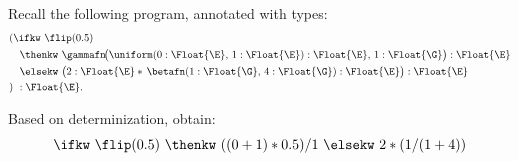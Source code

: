 \begin{example}
  Recall the following program, annotated with types:
  \[
    \begin{aligned}
    &(\ifkw\ \flip(0.5) \\
    &\quad \thenkw\ \gammafn\!\big(
      \uniform(0 : \Float{\E},\, 1 : \Float{\E}) : \Float{\E},\,
      1 : \Float{\G}
    \big) : \Float{\E} \\
    &\quad \elsekw\ \big(
      2 : \Float{\E}
      *\,
      \betafn(1 : \Float{\G},\, 4 : \Float{\G}) : \Float{\E}
    \big) : \Float{\E} \\
    &)\ : \Float{\E}.
    \end{aligned}
  \]

  Based on determinization, obtain:
  \[
    \ifkw\ \flip( 0.5 )\ \thenkw\ (( 0 + 1 ) * 0.5) / 1\ \elsekw\ 2 * ( 1 / ( 1 + 4 ) )
  \]
\end{example}


